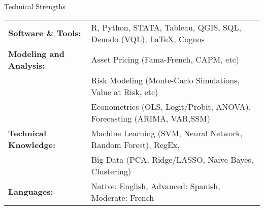\documentclass{resume} %
\begin{document}

\begin{rSection}{Technical Strengths}

\begin{tabular}{ @{} >{\bfseries}l @{\hspace{6ex}} l }
Software \& Tools: & R, Python, STATA, Tableau, QGIS, SQL, Denodo (VQL), LaTeX, Cognos\\
Modeling and Analysis: \ & Asset Pricing (Fama-French, CAPM, etc)\\
\ & Risk Modeling (Monte-Carlo Simulations, Value at Risk, etc)\\
\ & Econometrics (OLS, Logit/Probit, ANOVA), Forecasting (ARIMA, VAR,SSM)\\
Technical Knowledge: \ &  Machine Learning (SVM, Neural Network, Random Forest), RegEx, \\
\ & Big Data (PCA, Ridge/LASSO, Naive Bayes, Clustering)\\
Languages: \ &  Native: English, Advanced: Spanish, Moderate: French \\
\end{tabular}

\end{rSection}
\end{document}
